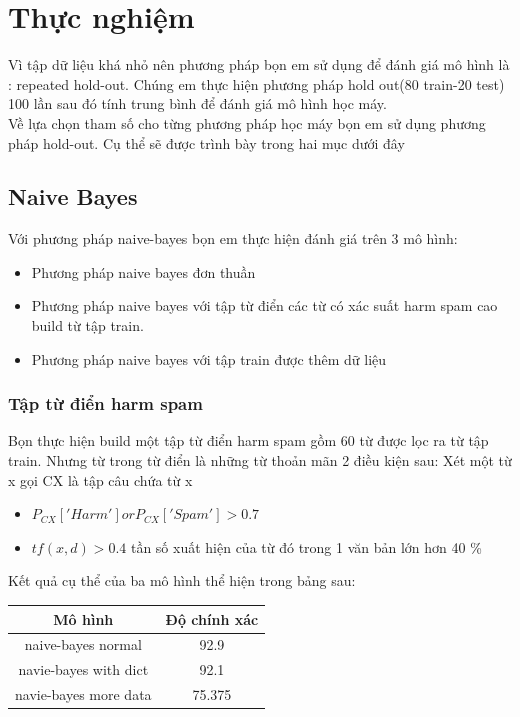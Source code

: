 \documentclass[a4paper,12pt]{report}
\begin{document}
\chapter{Thực nghiệm}
Vì tập dữ liệu khá nhỏ nên phương pháp bọn em sử dụng để đánh giá mô hình là : repeated hold-out. Chúng em thực hiện phương pháp hold out(80 train-20 test) 100 lần sau đó tính trung bình để đánh giá mô hình học máy.\\

Về lựa chọn tham số cho từng phương pháp học máy bọn em sử dụng phương pháp hold-out. Cụ thể sẽ được trình bày trong hai mục dưới đây
\section{Naive Bayes}
Với phương pháp naive-bayes bọn em thực hiện đánh giá trên 3 mô hình:
\begin{itemize}
\item Phương pháp naive bayes đơn thuần
\item Phương pháp naive bayes với tập từ điển các từ có xác suất harm spam cao build từ tập train.
\item Phương pháp naive bayes với tập train được thêm dữ liệu
\end{itemize}
\subsection{Tập từ điển harm spam}
Bọn thực hiện build một tập từ điển harm spam gồm 60 từ được lọc ra từ tập train. Nhưng từ trong từ điển là những từ thoản mãn 2 điều kiện sau:
Xét một từ x gọi CX là  tập câu chứa từ x
\begin{itemize}
\item $P_{CX}['Harm'] or P_{CX}['Spam'] >0.7$
\item $tf(x,d) >0.4$ tần số xuất hiện của từ đó trong 1 văn bản lớn hơn 40 \%
\end{itemize}
Kết quả cụ thể của ba mô hình thể hiện trong bảng sau:
\begin{longtable}{|c|c|}
\hline 
Mô hình & Độ chính xác \\ \hline
naive-bayes normal & 92.9\\ \hline
navie-bayes with dict & 92.1 \\ \hline
navie-bayes more data & 75.375\\ \hline
\end{longtable}
\end{document}
